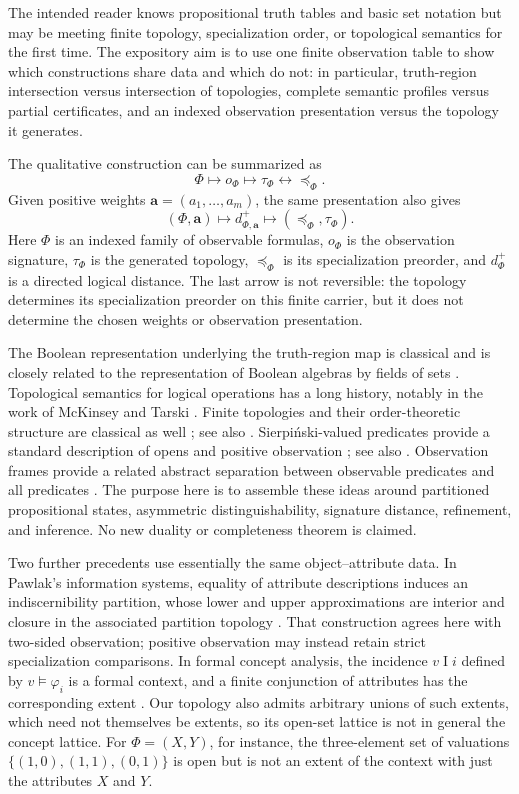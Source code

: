 \documentclass[11pt]{article}
\theoremstyle{definition}
\theoremstyle{plain}
\theoremstyle{remark}
\begin{document}
The intended reader knows propositional truth tables and basic set notation but
may be meeting finite topology, specialization order, or topological semantics
for the first time.  The expository aim is to use one finite observation table
to show which constructions share data and which do not: in particular,
truth-region intersection versus intersection of topologies, complete semantic
profiles versus partial certificates, and an indexed observation presentation
versus the topology it generates.

The qualitative construction can be summarized as
\[
  \Phi\longmapsto o_\Phi\longmapsto\tau_\Phi
  \longleftrightarrow\preceq_\Phi.
\]
Given positive weights $\mathbf a=(a_1,\ldots,a_m)$, the same presentation also
gives
\[
  (\Phi,\mathbf a)\longmapsto d^+_{\Phi,\mathbf a}
  \longmapsto (\preceq_\Phi,\tau_\Phi).
\]
Here $\Phi$ is an indexed family of observable formulas, $o_\Phi$ is the observation
signature, $\tau_\Phi$ is the generated topology, $\preceq_\Phi$ is its
specialization preorder, and $d_\Phi^+$ is a directed logical distance.  The
last arrow is not reversible: the topology determines its specialization
preorder on this finite carrier, but it does not determine the chosen weights
or observation presentation.

The Boolean representation underlying the truth-region map is classical and
is closely related to the representation of Boolean algebras by fields of sets
\cite{Stone1936}.  Topological semantics for logical operations has a long
history, notably in the work of McKinsey and Tarski \cite{McKinseyTarski1944}.
Finite topologies and their order-theoretic structure are classical as well
\cite[pp.~325--327]{Stong1966}; see also \cite{Alexandroff1937}.
Sierpi\'nski-valued predicates provide a standard description of opens and
positive observation \cite[Ch.~1]{Vickers1989}; see also
\cite[Example~1.12(3)]{Vickers2007}.
Observation frames provide a related abstract separation between observable
predicates and all predicates \cite{BonsangueJacobsKok1995}.  The purpose here
is to assemble these ideas around partitioned propositional states, asymmetric
distinguishability, signature distance, refinement, and inference.  No new
duality or completeness theorem is claimed.

Two further precedents use essentially the same object--attribute data.  In
Pawlak's information systems, equality of attribute descriptions induces an
indiscernibility partition, whose lower and upper approximations are interior
and closure in the associated partition topology
\cite[Sec.~2.2, pp.~343--344]{Pawlak1982}.  That
construction agrees here with two-sided observation; positive observation may
instead retain strict specialization comparisons.  In formal concept analysis,
the incidence $v\mathrel I i$ defined by $v\models\varphi_i$ is a formal context,
and a finite conjunction of attributes has the corresponding extent
\cite[Sec.~1.1]{GanterWille1999}.  Our topology also admits arbitrary unions of such
extents, which need not themselves be extents, so its open-set lattice is not in
general the concept lattice.  For $\Phi=(X,Y)$, for instance, the three-element
set of valuations $\{(1,0),(1,1),(0,1)\}$ is open but is not an extent of the
context with just the attributes $X$ and $Y$.
\end{document}
